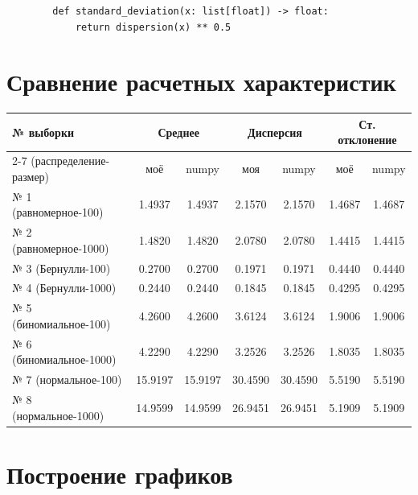 \documentclass[a4paper,14pt]{extarticle}
\begin{document}
    \begin{verbatim}
        def standard_deviation(x: list[float]) -> float:
            return dispersion(x) ** 0.5
    \end{verbatim}

    \section{Сравнение расчетных характеристик}

    \begin{table}[h!]
        \centering
        \label{tab:results_lines}
        \small
        \begin{tabular}{|l|c|c|c|c|c|c|}
            \hline
            \textbf{№ выборки} & \multicolumn{2}{c|}{\textbf{Среднее}} & \multicolumn{2}{c|}{\textbf{Дисперсия}} & \multicolumn{2}{c|}{\textbf{Ст. отклонение}} \\
            \cline{2-7} %
            (распределение-размер) & моё & numpy & моя & numpy & моё & numpy \\
            \hline
            № 1 (равномерное-100)  & 1.4937 & 1.4937 & 2.1570 & 2.1570 & 1.4687 & 1.4687 \\ \hline
            № 2 (равномерное-1000) & 1.4820 & 1.4820 & 2.0780 & 2.0780 & 1.4415 & 1.4415 \\ \hline
            № 3 (Бернулли-100)     & 0.2700 & 0.2700 & 0.1971 & 0.1971 & 0.4440 & 0.4440 \\ \hline
            № 4 (Бернулли-1000)    & 0.2440 & 0.2440 & 0.1845 & 0.1845 & 0.4295 & 0.4295 \\ \hline
            № 5 (биномиальное-100) & 4.2600 & 4.2600 & 3.6124 & 3.6124 & 1.9006 & 1.9006 \\ \hline
            № 6 (биномиальное-1000)& 4.2290 & 4.2290 & 3.2526 & 3.2526 & 1.8035 & 1.8035 \\ \hline
            № 7 (нормальное-100)   & 15.9197 & 15.9197 & 30.4590 & 30.4590 & 5.5190 & 5.5190 \\ \hline
            № 8 (нормальное-1000)  & 14.9599 & 14.9599 & 26.9451 & 26.9451 & 5.1909 & 5.1909 \\ \hline
        \end{tabular}
    \end{table}

    \section{Построение графиков}
\end{document}
